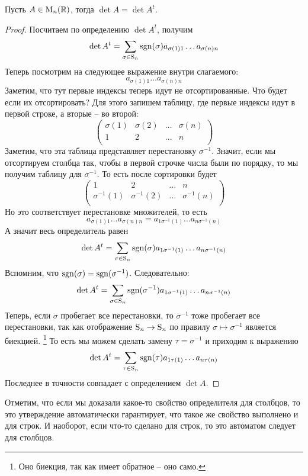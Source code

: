 \begin{claim}
\label{claim::DetTranspose}
Пусть $A\in \operatorname{M}_{n}(\mathbb R)$, тогда $\det A = \det A^t$.
\end{claim}
\begin{proof}
Посчитаем по определению $\det A^t$, получим
\[
\det A^t = \sum_{\sigma\in\operatorname{S}_{n}}\operatorname{sgn}(\sigma)a_{\sigma(1)1} \ldots a_{\sigma(n)n}
\]
Теперь посмотрим на следующее выражение внутри слагаемого:
\[
a_{\sigma(1)1} \ldots a_{\sigma(n)n}
\]
Заметим, что тут первые индексы теперь идут не отсортированные.
Что будет если их отсортировать?
Для этого запишем таблицу, где первые индексы идут в первой строке, а вторые -- во второй:
\[
\begin{pmatrix}
{\sigma(1)}&{\sigma(2)}&{\ldots}&{\sigma(n)}\\
{1}&{2}&{\ldots}&{n}\\
\end{pmatrix}
\]
Заметим, что эта таблица представляет перестановку $\sigma^{-1}$.
Значит, если мы отсортируем столбца так, чтобы в первой строчке числа были по порядку, то мы получим таблицу для $\sigma^{-1}$.
То есть после сортировки будет
\[
\begin{pmatrix}
{1}&{2}&{\ldots}&{n}\\
{\sigma^{-1}(1)}&{\sigma^{-1}(2)}&{\ldots}&{\sigma^{-1}(n)}\\
\end{pmatrix}
\]
Но это соответствует перестановке множителей, то есть
\[
a_{\sigma(1)1} \ldots a_{\sigma(n)n} = a_{1\sigma^{-1}(1)} \ldots a_{n\sigma^{-1}(n)}
\]
А значит весь определитель равен
\[
\det A^t = \sum_{\sigma\in\operatorname{S}_{n}}\operatorname{sgn}(\sigma)a_{1\sigma^{-1}(1)} \ldots a_{n\sigma^{-1}(n)}
\]
Вспомним, что $\operatorname{sgn}(\sigma) = \operatorname{sgn}(\sigma^{-1})$.
Следовательно:
\[
\det A^t = \sum_{\sigma\in\operatorname{S}_{n}}\operatorname{sgn}(\sigma^{-1}) a_{1 \sigma^{-1}(1)}\ldots a_{n\sigma^{-1}(n)}
\]
Теперь, если $\sigma$ пробегает все перестановки, то $\sigma^{-1}$ тоже пробегает все перестановки, так как отображение $\operatorname{S}_{n}\to \operatorname{S}_{n}$ по правилу $\sigma\mapsto \sigma^{-1}$ является биекцией.%
\footnote{Оно биекция, так как имеет обратное -- оно само.}
То есть мы можем сделать замену $\tau = \sigma^{-1}$ и приходим к выражению
\[
\det A^t = \sum_{\tau\in\operatorname{S}_{n}}\operatorname{sgn}(\tau)a_{1\tau(1)}\ldots a_{n\tau(n)}
\]
Последнее в точности совпадает с определением $\det A$.
\end{proof}

Отметим, что если мы доказали какое-то свойство определителя для столбцов, то это утверждение автоматически гарантирует, что такое же свойство выполнено и для строк.
И наоборот, если что-то сделано для строк, то это автоматом следует для столбцов.

